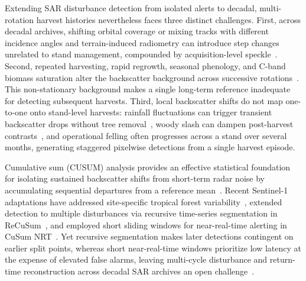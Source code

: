 Extending SAR disturbance detection from isolated alerts to decadal, multi-rotation harvest histories nevertheless faces three distinct challenges. First, across decadal archives, shifting orbital coverage or mixing tracks with different incidence angles and terrain-induced radiometry can introduce step changes unrelated to stand management, compounded by acquisition-level speckle~\citep{Small2011RTC,Quegan2001Speckle}. Second, repeated harvesting, rapid regrowth, seasonal phenology, and C-band biomass saturation alter the backscatter background across successive rotations~\citep{Santoro2018SARBiomass,Spracklen2021Acacia,VanDerWoude2024ManagementDisturbance}. This non-stationary background makes a single long-term reference inadequate for detecting subsequent harvests. Third, local backscatter shifts do not map one-to-one onto stand-level harvests: rainfall fluctuations can trigger transient backscatter drops without tree removal~\citep{Doblas2020Rainfall}, woody slash can dampen post-harvest contrasts~\citep{Balling2023Texture}, and operational felling often progresses across a stand over several months, generating staggered pixelwise detections from a single harvest episode.

Cumulative sum (CUSUM) analysis provides an effective statistical foundation for isolating sustained backscatter shifts from short-term radar noise by accumulating sequential departures from a reference mean~\citep{Page1954CUSUM,RuizRamos2020CUSUMSMC,Ygorra2021CuSum}. Recent Sentinel-1 adaptations have addressed site-specific tropical forest variability~\citep{Sabir2024AdaptiveCuSUM}, extended detection to multiple disturbances via recursive time-series segmentation in ReCuSum~\citep{Ygorra2023ReCuSum}, and employed short sliding windows for near-real-time alerting in CuSum NRT~\citep{Ygorra2024CuSumNRT}. Yet recursive segmentation makes later detections contingent on earlier split points, whereas short near-real-time windows prioritize low latency at the expense of elevated false alarms, leaving multi-cycle disturbance and return-time reconstruction across decadal SAR archives an open challenge~\citep{Mercier2026SmallLogging}.

